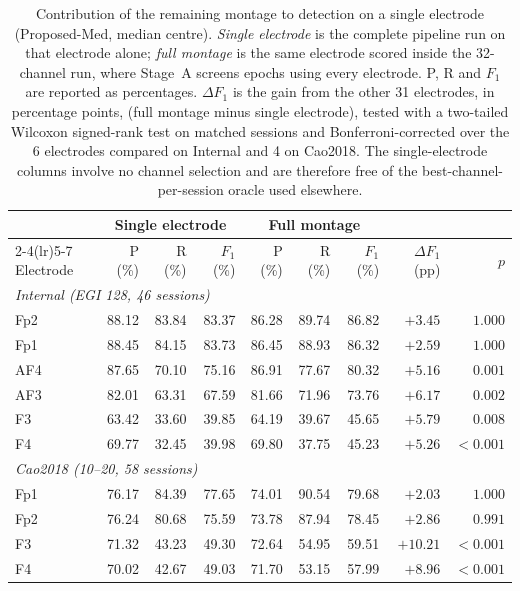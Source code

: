 \begin{table}[htbp]
\centering
\footnotesize
\setlength{\tabcolsep}{4pt}
\caption{Contribution of the remaining montage to detection on a single electrode (Proposed-Med, median centre). \emph{Single electrode} is the complete pipeline run on that electrode alone; \emph{full montage} is the same electrode scored inside the 32-channel run, where Stage~A screens epochs using every electrode. P, R and $F_1$ are reported as percentages. $\Delta F_1$ is the gain from the other 31 electrodes, in percentage points, (full montage minus single electrode), tested with a two-tailed Wilcoxon signed-rank test on matched sessions and Bonferroni-corrected over the 6 electrodes compared on Internal and 4 on Cao2018. The single-electrode columns involve no channel selection and are therefore free of the best-channel-per-session oracle used elsewhere.}
\label{tab:exp1_solo_vs_montage}
\begin{tabular}{lrrrrrrrr}
\toprule
 & \multicolumn{3}{c}{Single electrode} & \multicolumn{3}{c}{Full montage} & & \\
\cmidrule(lr){2-4}\cmidrule(lr){5-7}
Electrode & P (\%) & R (\%) & $F_1$ (\%) & P (\%) & R (\%) & $F_1$ (\%) & $\Delta F_1$ (pp) & $p$ \\
\midrule
\multicolumn{9}{l}{\textit{Internal (EGI 128, 46 sessions)}} \\[2pt]
Fp2 & 88.12 & 83.84 & 83.37 & 86.28 & 89.74 & 86.82 & $+3.45$ & $1.000$ \\
Fp1 & 88.45 & 84.15 & 83.73 & 86.45 & 88.93 & 86.32 & $+2.59$ & $1.000$ \\
AF4 & 87.65 & 70.10 & 75.16 & 86.91 & 77.67 & 80.32 & $+5.16$ & $0.001$ \\
AF3 & 82.01 & 63.31 & 67.59 & 81.66 & 71.96 & 73.76 & $+6.17$ & $0.002$ \\
F3 & 63.42 & 33.60 & 39.85 & 64.19 & 39.67 & 45.65 & $+5.79$ & $0.008$ \\
F4 & 69.77 & 32.45 & 39.98 & 69.80 & 37.75 & 45.23 & $+5.26$ & $<0.001$ \\
\midrule
\multicolumn{9}{l}{\textit{Cao2018 (10--20, 58 sessions)}} \\[2pt]
Fp1 & 76.17 & 84.39 & 77.65 & 74.01 & 90.54 & 79.68 & $+2.03$ & $1.000$ \\
Fp2 & 76.24 & 80.68 & 75.59 & 73.78 & 87.94 & 78.45 & $+2.86$ & $0.991$ \\
F3 & 71.32 & 43.23 & 49.30 & 72.64 & 54.95 & 59.51 & $+10.21$ & $<0.001$ \\
F4 & 70.02 & 42.67 & 49.03 & 71.70 & 53.15 & 57.99 & $+8.96$ & $<0.001$ \\
\bottomrule
\end{tabular}
\end{table}
